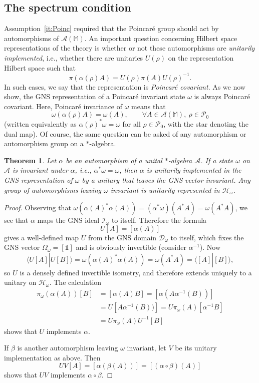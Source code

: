 \documentclass[12pt]{article}
\newcommand{\1}{\mathds{1}}                         %
\newcommand{\MM}{\mathbb{M}}
\newcommand{\HH}{{\mathcal{H}}}
\newcommand{\DD}{{\mathscr{D}}}
\newcommand{\II}{{\mathbb{1}}}
\newcommand{\Ac}{{\mathcal{A}}}
\newcommand{\Ic}{{\mathcal{I}}}
\newcommand{\Pc}{{\mathcal{P}}}
\newcommand{\ip}[2]{\langle #1|#2\rangle}
\newtheorem{theorem}{Theorem}%
\begin{document}
\subsection{The spectrum condition}
Assumption~\ref{it:Poinc} required that
the Poincar\'e group should act by automorphisms of $\Ac(\MM)$. An important question concerning Hilbert space representations of the theory is whether or not these automorphisms are \emph{unitarily implemented}, i.e., whether there are unitaries $U(\rho)$ on the representation Hilbert space such that
\[
\pi(\alpha(\rho)A) = U(\rho) \pi(A) U(\rho)^{-1}.
\]
In such cases, we say that the representation is \emph{Poincar\'e covariant}.
As we now show, the GNS representation of a Poincar\'e invariant state $\omega$ is always Poincar\'e covariant. Here, Poincar\'e invariance of $\omega$ means that 
\[
\omega(\alpha(\rho)A) = \omega(A), \qquad\forall A\in\Ac(\MM),~\rho\in\Pc_0
\] 
(written equivalently as $\alpha(\rho)^*\omega=\omega$ for all $\rho\in\Pc_0$, with the star denoting the dual map). Of course, the same question can be asked of any automorphism or automorphism group on a $*$-algebra.
\begin{theorem}
	Let $\alpha$ be an automorphism of a unital $*$-algebra $\Ac$. If a state $\omega$ on $\Ac$ is invariant under $\alpha$, i.e., $\alpha^*\omega=\omega$, then $\alpha$ is unitarily implemented in the GNS representation of $\omega$ by a unitary that leaves the GNS vector invariant. Any group of automorphisms leaving $\omega$ invariant is unitarily represented in $\HH_\omega$. 
\end{theorem}
\begin{proof}
	Observing that $\omega(\alpha(A)^*\alpha(A))=(\alpha^*\omega)(A^*A)=\omega(A^*A)$, we see that $\alpha$ maps the GNS ideal $\Ic_\omega$ to itself. Therefore the formula
	\[
	U[A] = [\alpha(A)]
	\]
	gives a well-defined map $U$ from the GNS domain $\DD_\omega$ to itself, which fixes the GNS vector $\Omega_\omega=[\II]$ and is obviously invertible (consider $\alpha^{-1}$). Now
	\[
	\ip{U[A]}{U[B]} = \omega(\alpha(A)^*\alpha(A)) = \omega(A^*A) = \ip{[A]}{[B]},
	\]	
	so $U$ is a densely defined invertible isometry, and therefore extends uniquely to a unitary on $\HH_\omega$. The calculation
	\begin{align*}
	\pi_\omega(\alpha(A))[B] &= [\alpha(A)B] = [\alpha(A\alpha^{-1}(B))]\\
	& = U[A\alpha^{-1}(B))] = U\pi_\omega(A)[\alpha^{-1}B]\\
	& = U\pi_\omega(A)U^{-1}[B]
	\end{align*}
	shows that $U$ implements $\alpha$. 
	
	If $\beta$ is another automorphism leaving $\omega$ invariant, let $V$ be its unitary implementation as above. Then 
	\[
	UV[A]= [\alpha(\beta(A))] = [(\alpha\circ\beta)(A)]
	\]
	shows that $UV$ implements $\alpha\circ\beta$. 
\end{proof}
\end{document}
